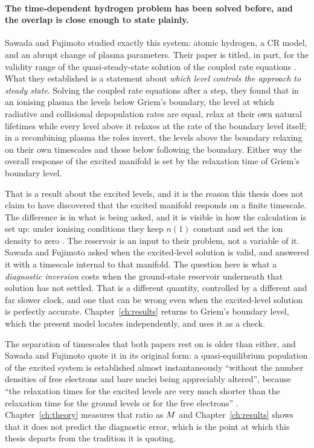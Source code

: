 \paragraph{The time-dependent hydrogen problem has been solved before, and the
overlap is close enough to state plainly.} Sawada and Fujimoto studied exactly
this system: atomic hydrogen, a CR model, and an abrupt change of plasma
parameters. Their paper is titled, in part, for the validity range of the
quasi-steady-state solution of the coupled rate equations
\cite{SawadaFujimoto1994}. What they established is a statement about
\emph{which level controls the approach to steady state}. Solving the coupled
rate equations after a step, they found that in an ionising plasma the levels
below Griem's boundary, the level at which radiative and collisional
depopulation rates are equal, relax at their own natural lifetimes while every
level above it relaxes at the rate of the boundary level itself; in a recombining
plasma the roles invert, the levels above the boundary relaxing on their own
timescales and those below following the boundary. Either way the overall
response of the excited manifold is set by the relaxation time of Griem's
boundary level.

That is a result about the excited levels, and it is the reason this thesis does
not claim to have discovered that the excited manifold responds on a finite
timescale. The difference is in what is being asked, and it is visible in how
the calculation is set up: under ionising conditions they keep $n(1)$ constant
and set the ion density to zero \cite[p.~5566]{SawadaFujimoto1994}. The
reservoir is an input to their problem, not a variable of it. Sawada and
Fujimoto asked when the excited-level solution is valid, and answered it with a
timescale internal to that manifold. The question here is what a \emph{diagnostic
inversion} costs when the ground-state reservoir underneath that solution has not
settled. That is a different quantity, controlled by a different and far slower
clock, and one that can be wrong even when the excited-level solution is
perfectly accurate. Chapter~\ref{ch:results} returns to Griem's boundary
level, which the present model locates independently, and uses it as a check.

The separation of timescales that both papers rest on is older than either, and
Sawada and Fujimoto quote it in its original form: a quasi-equilibrium
population of the excited system is established almost instantaneously
\enquote{without the number densities of free electrons and bare nuclei being
appreciably altered}, because \enquote{the relaxation times for the excited
levels are very much shorter than the relaxation time for the ground levels or
for the free electrons} \cite[p.~5566]{SawadaFujimoto1994}. Chapter~\ref{ch:theory}
measures that ratio as $M$ and Chapter~\ref{ch:results} shows that it does
not predict the diagnostic error, which is the point at which this thesis
departs from the tradition it is quoting.

